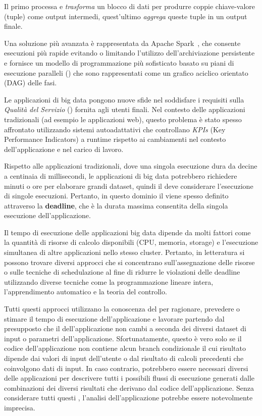 Il primo processa e \textit{trasforma} un blocco di dati per produrre coppie chiave-valore (tuple) come output intermedi, quest'ultimo \textit{aggrega} queste tuple in un output finale.

Una soluzione più avanzata è rappresentata da Apache Spark~\cite{misc:ApacheSpark}, che consente esecuzioni più rapide evitando o limitando l'utilizzo dell'archiviazione persistente e fornisce un modello di programmazione più sofisticato basato su piani di esecuzione paralleli (\plans) che sono rappresentati come un grafico aciclico orientato (DAG) delle fasi.

Le applicazioni di big data pongono nuove sfide nel soddisfare i requisiti sulla \textit{Qualità del Servizio} (\qos) fornita agli utenti finali. Nel contesto delle applicazioni tradizionali (ad esempio le applicazioni web), questo problema è stato spesso affrontato utilizzando sistemi autoadattativi che controllano \textit {KPIs} (Key Performance Indicators) a runtime rispetto ai cambiamenti nel contesto dell'applicazione e nel carico di lavoro.

Rispetto alle applicazioni tradizionali, dove una singola esecuzione dura da decine a centinaia di millisecondi, le applicazioni di big data potrebbero richiedere minuti o ore per elaborare grandi dataset, quindi il  \qos deve considerare l'esecuzione di singole esecuzioni. Pertanto, in questo dominio il \qos viene spesso definito attraverso la \textbf{deadline}, che è la durata massima consentita della singola esecuzione  dell'applicazione.

Il tempo di esecuzione delle applicazioni big data dipende da molti fattori come la quantità di risorse di calcolo disponibili (CPU, memoria, storage) e l'esecuzione simultanea di altre applicazioni nello stesso cluster. Pertanto, in letteratura si possono trovare diversi approcci \cite{Verma2011, Hindman2011, Cheng2015} che si concentrano sull'assegnazione delle risorse o sulle tecniche di schedulazione al fine di ridurre le violazioni delle deadline  utilizzando diverse tecniche come la programmazione lineare intera, l'apprendimento automatico e la teoria del controllo.

Tutti questi approcci utilizzano la conoscenza del \plan per ragionare, prevedere o stimare il tempo di esecuzione dell'applicazione e lavorare partendo dal presupposto che il \plan dell'applicazione non cambi a seconda dei diversi dataset di input o parametri dell'applicazione. Sfortunatamente, questo è vero solo se il codice dell'applicazione non contiene alcun branch condizionale il cui risultato dipende dai valori di input dell'utente o dal risultato di calcoli precedenti che coinvolgono dati di input. In caso contrario, potrebbero essere necessari diversi \plans delle applicazioni per descrivere tutti i possibili flussi di esecuzione generati dalle combinazioni dei diversi risultati che derivano dal codice dell'applicazione. Senza considerare tutti questi \plans, l'analisi dell'applicazione potrebbe essere notevolmente imprecisa.

